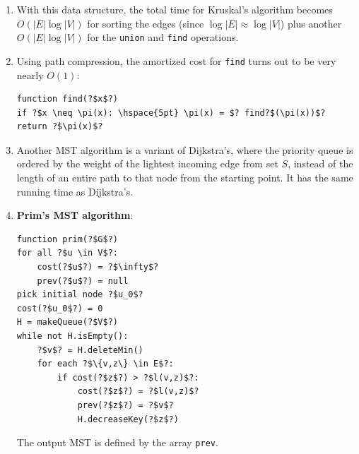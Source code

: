 \documentclass[10pt]{article}
\begin{document}
\begin{multicols}{2}
\begin{addmargin}[0.8em]{0.5em}
\begin{enumerate}[label=(\alph*)]
\begin{verbatim}
function find(?$x$?)
while ?$x \neq \pi(x): \hspace{5pt} x = \pi(x)$?
return ?$x$?

function union(?$x,y$?)
?$r_x$?, ?$r_y$? = find(?$x$?), find(?$y$?)
if ?$r_x = r_y$?: return
if rank?$(r_x)$? > rank?$(r_y)$?: ?$\pi(r_y) = r_x$?
else: ?$\pi(r_x) = r_y$?
if rank?$(r_x)$? = rank?$(r_y)$?: rank?$(r_y)$? += 1
\end{verbatim}      
        where $\pi(x)$ denotes the parent of $x$ and \texttt{rank}($x$) represents the height of the subtree rooted at $x$. All the trees have height $\leq \log{n}$, so that \texttt{makeset} is $O(1)$, \texttt{find} is $O(\log{n})$, and \texttt{union} is $O(\log{n})$.
        \item With this data structure, the total time for Kruskal’s algorithm becomes $O(|E| \log{|V|})$ for sorting the edges (since $\log{|E|} \approx \log{|V|}$) plus another $O(|E| \log{|V|})$ for the \texttt{union} and \texttt{find} operations.
        \item Using path compression, the amortized cost for \texttt{find} turns out to be very nearly $O(1)$:
\begin{verbatim}
function find(?$x$?)
if ?$x \neq \pi(x): \hspace{5pt} \pi(x) = $? find?$(\pi(x))$?
return ?$\pi(x)$?
\end{verbatim}        
        \item Another MST algorithm is a variant of Dijkstra's, where the priority queue is ordered by the weight of the lightest incoming edge from set $S$, instead of the length of an entire path to that node from the starting point. It has the same running time as Dijkstra's.
        \item \textbf{Prim's MST algorithm}:
\begin{verbatim}
function prim(?$G$?)
for all ?$u \in V$?:
    cost(?$u$?) = ?$\infty$?
    prev(?$u$?) = null
pick initial node ?$u_0$?
cost(?$u_0$?) = 0
H = makeQueue(?$V$?)
while not H.isEmpty():
    ?$v$? = H.deleteMin()
    for each ?$\{v,z\} \in E$?:
        if cost(?$z$?) > ?$l(v,z)$?:
            cost(?$z$?) = ?$l(v,z)$?
            prev(?$z$?) = ?$v$?
            H.decreaseKey(?$z$?)
\end{verbatim}
        The output MST is defined by the array \texttt{prev}.
    \end{enumerate}
    

\end{addmargin}
\end{multicols}
\end{document}
